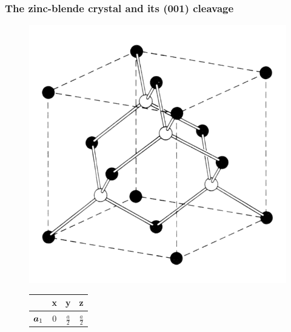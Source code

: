 	\subsubsection{The zinc-blende crystal and its (001) cleavage} \label{cleavage_fcc}
	\begin{figure}[b!]
		\begin{minipage}[c]{.38\linewidth}
			\centering
			\includegraphics[width=.9\linewidth]{andere_bilder/diamond.png}
		\end{minipage}
		\hfill
		\begin{minipage}[c]{.25\linewidth}
			\centering
			\begin{tabular}{c c c c} 
				\hline
				& \textbf{x} & \textbf{y} & \textbf{z}\\ 
				\hline 
				\vspace{0.2cm} 
				$\boldsymbol{a}_1$ & 0 & $\frac{a}{2}$ & $\frac{a}{2}$ \\

\end{tabular}
\end{minipage}
\end{figure}

